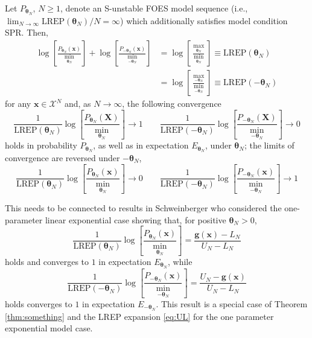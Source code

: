 \documentclass[]{article}
\theoremstyle{definition}
\newcommand{\REP}{\mathrm{LREP}}
\let\BeginKnitrBlock\begin \let\EndKnitrBlock\end
\begin{document}
\BeginKnitrBlock{theorem}
\protect\hypertarget{thm:something}{}{\label{thm:something}}Let
\(P_{\boldsymbol \theta_N}\), \(N \geq 1\), denote an S-unstable FOES
model sequence (i.e.,
\(\lim_{N\to \infty}\REP(\boldsymbol \theta_N)/N=\infty\)) which
additionally satisfies model condition SPR. Then,
\begin{align*}
\log\left[ \frac{P_{\boldsymbol \theta_N }(\boldsymbol x) }{\min_{\boldsymbol \theta_N}}\right] +  \log\left[ \frac{P_{-\boldsymbol \theta_N }(\boldsymbol x) }{\min_{-\boldsymbol \theta_N}}\right]  &=    \log\left[ \frac{\max_{\boldsymbol \theta_N}}{\min_{\boldsymbol \theta_N}}\right]  \equiv  \REP(\boldsymbol \theta_N)\\
& = \log\left[ \frac{\max_{-\boldsymbol \theta_N} }{\min_{-\boldsymbol \theta_N}}\right] \equiv \REP(-\boldsymbol \theta_N)
\end{align*}
for any \(\boldsymbol x\in\mathcal{X}^N\) and, as \(N\to \infty\), the
following convergence \[
\frac{1}{\REP(\boldsymbol \theta_N)} \log\left[ \frac{P_{\boldsymbol \theta_N }(\boldsymbol X) }{\min_{\boldsymbol \theta_N}}\right]  \rightarrow 1 \qquad \frac{1}{\REP(-\boldsymbol \theta_N)}\log\left[ \frac{P_{-\boldsymbol \theta_N }(\boldsymbol X) }{\min_{-\boldsymbol \theta_N}}\right]  \rightarrow 0
\] holds in probability \(P_{\boldsymbol \theta_N}\), as well as in
expectation \(E_{\boldsymbol \theta_N}\), under
\(\boldsymbol \theta_N\); the limits of convergence are reversed under
\(-\boldsymbol \theta_N\), \[
\frac{1}{\REP(\boldsymbol \theta_N)} \log\left[ \frac{P_{\boldsymbol \theta_N }(\boldsymbol x) }{\min_{\boldsymbol \theta_N}}\right]  \rightarrow 0 \qquad \frac{1}{\REP(-\boldsymbol \theta_N)}\log\left[ \frac{P_{-\boldsymbol \theta_N }(\boldsymbol x) }{\min_{-\boldsymbol \theta_N}}\right]  \rightarrow 1
\]
\EndKnitrBlock{theorem} This needs to be connected to results in
Schweinberger who considered the one-parameter linear exponential case
showing that, for positive \(\boldsymbol \theta_N>0\), \[
\frac{1}{\REP(\boldsymbol \theta_N)} \log\left[ \frac{P_{\boldsymbol \theta_N }(\boldsymbol x) }{\min_{\boldsymbol \theta_N}}\right] = \frac{\boldsymbol g(\boldsymbol x) - L_N}{U_N-L_N} 
\] holds and converges to \(1\) in expectation
\(E_{\boldsymbol \theta_N}\), while \[   
\frac{1}{\REP(-\boldsymbol \theta_N)} \log\left[ \frac{P_{-\boldsymbol \theta_N }(\boldsymbol x) }{\min_{-\boldsymbol \theta_N}}\right] = \frac{U_N -\boldsymbol g(\boldsymbol x)}{U_N-L_N} 
\] holds converges to \(1\) in expectation
\(E_{-\boldsymbol \theta_N}\). This result is a special case of Theorem
\ref{thm:something} and the LREP expansion \eqref{eq:UL} for the one
parameter exponential model case.
\end{document}
